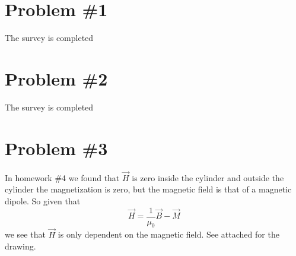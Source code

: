 \documentclass[11pt]{article}
\numberwithin{equation}{section}
\begin{document}


\section{Problem \#1}
The survey is completed
\section{Problem \#2}
The survey is completed

\section{Problem \#3}
In homework \#4 we found that $\vec{H}$ is zero inside the cylinder and outside the cylinder the magnetization is zero, but the magnetic field is that of a magnetic dipole. So given that
\begin{equation}
\vec{H} = \frac{1}{\mu_0}\vec{B}-\vec{M}
\label{Hfield}
\end{equation}
we see that $\vec{H}$ is only dependent on the magnetic field. See attached for the drawing.
\end{document}
